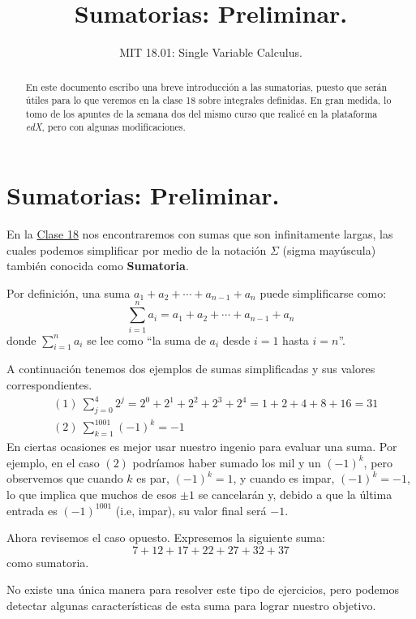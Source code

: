 \documentclass[12pt]{article}
\title{Sumatorias: Preliminar.}
\author{MIT 18.01: Single Variable Calculus.}
\date{}
\begin{document}
\maketitle

\begin{abstract}
{\noindent En este documento escribo una breve introducción a las sumatorias, puesto que serán útiles para lo que veremos en la clase 18 sobre integrales definidas. En gran medida, lo tomo de los apuntes de la semana dos del mismo curso que realicé en la plataforma \textit{edX}, pero con algunas modificaciones.}
\end{abstract}

\section{Sumatorias: Preliminar.}

En la \href{..\\intro-def-int.pdf}{Clase 18} nos encontraremos con sumas que son infinitamente largas, las cuales podemos simplificar por medio de la notación $\Sigma$ (sigma mayúscula) también conocida como \textbf{Sumatoria}.

Por definición, una suma $a_{1} + a_{2} + \cdots + a_{n - 1} + a_{n}$ puede simplificarse como:
\[
  \sum_{i = 1}^{n} a_{i} = a_{1} + a_{2} + \cdots + a_{n - 1} + a_{n}
\]
donde $\sum_{i = 1}^{n} a_{i}$ se lee como ``la suma de $a_{i}$ desde $i = 1$ hasta $i = n$''.

A continuación tenemos dos ejemplos de sumas simplificadas y sus valores correspondientes.
\begin{align*}
  & (1) \ \sum_{j = 0}^{4} 2^{j} = 2^{0} + 2^{1} + 2^{2} + 2^{3} + 2^{4} = 1 + 2 + 4 + 8 + 16 = 31 \\
  & (2) \ \sum_{k = 1}^{1001} (-1)^{k} = -1
\end{align*}
En ciertas ocasiones es mejor usar nuestro ingenio para evaluar una suma. Por ejemplo, en el caso $(2)$ podríamos haber sumado los mil y un $(-1)^{k}$, pero observemos que cuando $k$ es par, $(-1)^{k} = 1$, y cuando es impar, $(-1)^{k} = -1$, lo que implica que muchos de esos $\pm 1$ se cancelarán y, debido a que la última entrada es $(-1)^{1001}$ (i.e, impar), su valor final será $-1$.

Ahora revisemos el caso opuesto. Expresemos la siguiente suma:
\[
  7 + 12 + 17 + 22 + 27 + 32 + 37
\]
como sumatoria.

No existe una única manera para resolver este tipo de ejercicios, pero podemos detectar algunas características de esta suma para lograr nuestro objetivo.
\end{document}
